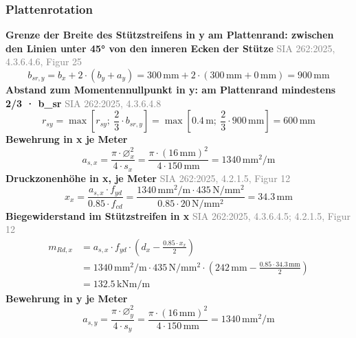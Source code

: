 \documentclass[11pt,a4paper]{article}
\newcommand{\normref}[1]{{\small\textcolor{gray}{#1}}}
\begin{document}
\subsubsection{Plattenrotation}
\noindent\textbf{Grenze der Breite des Stützstreifens in y am Plattenrand: zwischen den Linien unter 45° von den inneren Ecken der Stütze} \hfill \normref{SIA 262:2025, 4.3.6.4.6, Figur 25}
\begin{equation*}
b_{sr,y} = b_x + 2 \cdot \left(b_y + a_y\right) = 300\,\mathrm{mm} + 2 \cdot \left(300\,\mathrm{mm} + 0\,\mathrm{mm}\right) = 900\,\mathrm{mm}
\end{equation*}
\noindent\textbf{Abstand zum Momentennullpunkt in y: am Plattenrand mindestens 2/3 · b\_sr} \hfill \normref{SIA 262:2025, 4.3.6.4.8}
\begin{equation*}
r_{sy} = \max\left[r_{sy};\ \frac{2}{3} \cdot b_{sr,y}\right] = \max\left[0.4\,\mathrm{m};\ \frac{2}{3} \cdot 900\,\mathrm{mm}\right] = 600\,\mathrm{mm}
\end{equation*}
\noindent\textbf{Bewehrung in x je Meter}
\begin{equation*}
a_{s,x} = \frac{\pi \cdot \varnothing_x^{2}}{4 \cdot s_x} = \frac{\pi \cdot \left(16\,\mathrm{mm}\right)^{2}}{4 \cdot 150\,\mathrm{mm}} = 1340\,\mathrm{mm}^{2}/\mathrm{m}
\end{equation*}
\noindent\textbf{Druckzonenhöhe in x, je Meter} \hfill \normref{SIA 262:2025, 4.2.1.5, Figur 12}
\begin{equation*}
x_x = \frac{a_{s,x} \cdot f_{yd}}{0.85 \cdot f_{cd}} = \frac{1340\,\mathrm{mm}^{2}/\mathrm{m} \cdot 435\,\mathrm{N}/\mathrm{mm}^{2}}{0.85 \cdot 20\,\mathrm{N}/\mathrm{mm}^{2}} = 34.3\,\mathrm{mm}
\end{equation*}
\noindent\textbf{Biegewiderstand im Stützstreifen in x} \hfill \normref{SIA 262:2025, 4.3.6.4.5; 4.2.1.5, Figur 12}
\begin{equation*}
\begin{aligned}
  m_{Rd,x} &= a_{s,x} \cdot f_{yd} \cdot \left(d_x - \frac{0.85 \cdot x_x}{2}\right) \\
  &= 1340\,\mathrm{mm}^{2}/\mathrm{m} \cdot 435\,\mathrm{N}/\mathrm{mm}^{2} \cdot \left(242\,\mathrm{mm} - \frac{0.85 \cdot 34.3\,\mathrm{mm}}{2}\right) \\
  &= 132.5\,\mathrm{kNm}/\mathrm{m}
\end{aligned}
\end{equation*}
\noindent\textbf{Bewehrung in y je Meter}
\begin{equation*}
a_{s,y} = \frac{\pi \cdot \varnothing_y^{2}}{4 \cdot s_y} = \frac{\pi \cdot \left(16\,\mathrm{mm}\right)^{2}}{4 \cdot 150\,\mathrm{mm}} = 1340\,\mathrm{mm}^{2}/\mathrm{m}
\end{equation*}
\end{document}
